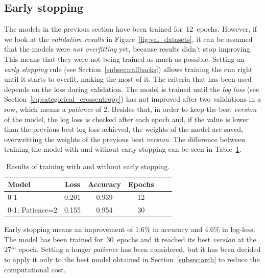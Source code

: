 \subsection{Early stopping}\label{subsec:early_stopping}
The models in the previous section have been trained for~12~epochs. However, if we look at the \emph{validation results} in Figure~\ref{fig:val_datasets}, it can be assumed that the models were \emph{not overfitting} yet, because results didn't stop improving. This means that they were not being trained as much as possible. Setting an \emph{early stopping} rule (see Section~\ref{subsec:callbacks}) allows training the \gls{cnn} right until it starts to overfit, making the most of it. The criteria that has been used depends on the loss during validation. The model is trained until the \emph{log loss} (see Section~\ref{eq:categorical_crossentropy}) has not improved after two validations in a row, which means a \textit{patience} of 2. Besides that, in order to keep the best \textit{version} of the model, the log loss is checked after each epoch and, if the value is lower than the previous best log loss achieved, the weights of the model are saved, overwritting the weights of the previous best \textit{version}. The difference between training the model with and without early stopping can be seen in Table~\ref{tbl:earlystopping}.
\begin{table}
	\centering
	\begin{tabular}{l*{4}{c}r}
		\textbf{Model} & \textbf{Loss} & \textbf{Accuracy} & \textbf{Epochs} \\
		\hline
		0-1 & 0.201 & 0.939 & 12 \\
		0-1; Patience=2 & 0.155 & 0.954 & 30 \\
	\end{tabular}
	\caption{Results of training with and without early stopping.}
	\label{tbl:earlystopping}
\end{table}

Early stopping means an improvement of 1.6\% in accuracy and 4.6\% in log-loss. The model has been trained for~30~epochs and it reached its best \textit{version} at the 27$^{th}$ epoch. Setting a longer \textit{patience} has been considered, but it has been decided to apply it only to the best model obtained in Section~\ref{subsec:arch} to reduce the computational cost.

